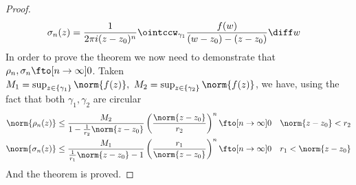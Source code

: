 \documentclass[../mmf.tex]{subfiles}
\begin{document}
\begin{proof}
\begin{equation*}
\begin{aligned}
			\sigma_n(z)&=\frac{1}{2\pi i(z-z_0)^n}\ointccw_{\gamma_1}\frac{f(w)}{(w-z_0)-(z-z_0)}\diff w
		\end{aligned}
	\end{equation*}
	In order to prove the theorem we now need to demonstrate that $\rho_n,\sigma_n\fto[n\to\infty]0$. Taken $M_1=\sup_{z\in\{\gamma_1\}}\norm{f(z)},\ M_2=\sup_{z\in\{\gamma_2\}}\norm{f(z)}$, we have, using the fact that both $\gamma_1,\gamma_2$ are circular
	\begin{equation*}
		\begin{aligned}
			\norm{\rho_n(z)}&\le\frac{M_2}{1-\frac{1}{r_2}\norm{z-z_0}}\left( \frac{\norm{z-z_0}}{r_2} \right)^n\fto[n\to\infty]0\quad\norm{z-z_0}<r_2\\
			\norm{\sigma_n(z)}&\le\frac{M_1}{\frac{1}{r_1}\norm{z-z_0}-1}\left( \frac{r_1}{\norm{z-z_0}} \right)^n\fto[n\to\infty]0\quad r_1<\norm{z-z_0}
		\end{aligned}
	\end{equation*}
	And the theorem is proved.
\end{proof}
\end{document}
